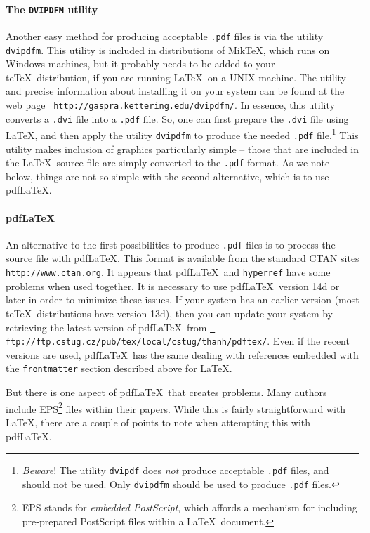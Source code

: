 \documentclass{entcs} \usepackage{entcsmacro}
\begin{document}
\paragraph{The \texttt{DVIPDFM} utility}
Another easy method for producing acceptable \texttt{.pdf} files is
via the utility \texttt{dvipdfm}. This utility is included in
distributions of Mik\TeX, which runs on Windows machines, but it
probably needs to be added to your te\TeX\ distribution, if you are
running \LaTeX\ on a UNIX machine. The utility and precise information
about installing it on your system can be found at the web page
\href{http://gaspra.kettering.edu/dvipdfm/}{\tt
  http://gaspra.kettering.edu/dvipdfm/}. In essence, this utility
converts a \texttt{.dvi} file into a \texttt{.pdf} file. So, one can
first prepare the \texttt{.dvi} file using \LaTeX, and then apply the
utility \texttt{dvipdfm} to produce the needed \texttt{.pdf}
file.\footnote{ \emph{Beware}! The utility \texttt{dvipdf} does
  \emph{not} produce acceptable \texttt{.pdf} files, and should not be
  used. Only \texttt{dvipdfm} should be used to produce \texttt{.pdf}
  files.} This utility makes inclusion of graphics particularly simple
-- those that are included in the \LaTeX\ source file are simply
converted to the \texttt{.pdf} format. As we note below, things are
not so simple with the second alternative, which is to use pdf\LaTeX.

\paragraph{pdf\LaTeX}
An alternative to the first possibilities to produce \texttt{.pdf}
files is to process the source file with pdf\LaTeX. This format is
available from the standard CTAN sites \href{http://www.ctan.org}{\tt
  http://www.ctan.org}. It appears that pdf\LaTeX\ and
\texttt{hyperref} have some problems when used together. It is
necessary to use pdf\LaTeX\ version 14d or later in order to minimize
these issues. If your system has an earlier version (most te\TeX\ 
distributions have version 13d), then you can update your system by
retrieving the latest version of pdf\LaTeX\ from
\href{ftp://ftp.cstug.cz/pub/tex/local/cstug/thanh/pdftex/}{\tt
  ftp://ftp.cstug.cz/pub/tex/local/cstug/thanh/pdftex/}. Even if the
recent versions are used, pdf\LaTeX\ has the same dealing with
references embedded with the \texttt{frontmatter} section described
above for \LaTeX.

But there is one aspect of pdf\LaTeX\ that creates problems. Many
authors include EPS\footnote{EPS stands for \emph{embedded
    PostScript}, which affords a mechanism for including pre-prepared
  PostScript files within a \LaTeX\ document.} files within their
papers. While this is fairly straightforward with \LaTeX, there are a
couple of points to note when attempting this with pdf\LaTeX.
\end{document}
